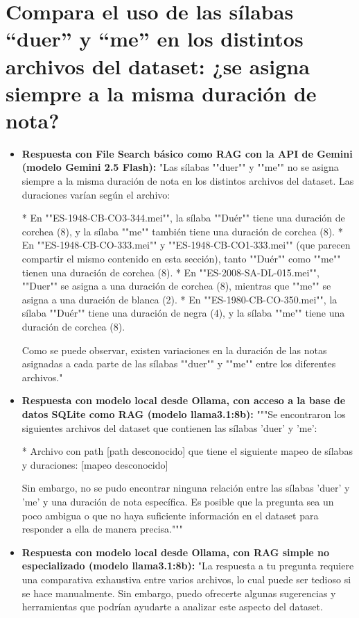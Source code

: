 \section{Compara el uso de las sílabas ``duer'' y ``me'' en los distintos archivos del dataset: ¿se asigna siempre a la misma duración de nota?}
\begin{itemize}
    \item \textbf{Respuesta con File Search básico como RAG con la API de Gemini (modelo Gemini 2.5 Flash):} "Las sílabas ""duer"" y ""me"" no se asigna siempre a la misma duración de nota en los distintos archivos del dataset. Las duraciones varían según el archivo:

*   En ""ES-1948-CB-CO3-344.mei"", la sílaba ""Duér"" tiene una duración de corchea (8), y la sílaba ""me"" también tiene una duración de corchea (8).
*   En ""ES-1948-CB-CO-333.mei"" y ""ES-1948-CB-CO1-333.mei"" (que parecen compartir el mismo contenido en esta sección), tanto ""Duér"" como ""me"" tienen una duración de corchea (8).
*   En ""ES-2008-SA-DL-015.mei"", ""Duer"" se asigna a una duración de corchea (8), mientras que ""me"" se asigna a una duración de blanca (2).
*   En ""ES-1980-CB-CO-350.mei"", la sílaba ""Duér"" tiene una duración de negra (4), y la sílaba ""me"" tiene una duración de corchea (8).

Como se puede observar, existen variaciones en la duración de las notas asignadas a cada parte de las sílabas ""duer"" y ""me"" entre los diferentes archivos."
    \item \textbf{Respuesta con modelo local desde Ollama, con acceso a la base de datos SQLite como RAG (modelo llama3.1:8b):} """Se encontraron los siguientes archivos del dataset que contienen las sílabas 'duer' y 'me':

* Archivo con path [path desconocido] que tiene el siguiente mapeo de sílabas y duraciones: [mapeo desconocido]

Sin embargo, no se pudo encontrar ninguna relación entre las sílabas 'duer' y 'me' y una duración de nota específica. Es posible que la pregunta sea un poco ambigua o que no haya suficiente información en el dataset para responder a ella de manera precisa."""
\item \textbf{Respuesta con modelo local desde Ollama, con RAG simple no especializado (modelo llama3.1:8b):} "La respuesta a tu pregunta requiere una comparativa exhaustiva entre varios archivos, lo cual puede ser tedioso si se hace manualmente. Sin embargo, puedo ofrecerte algunas sugerencias y herramientas que podrían ayudarte a analizar este aspecto del dataset.


\end{itemize}
